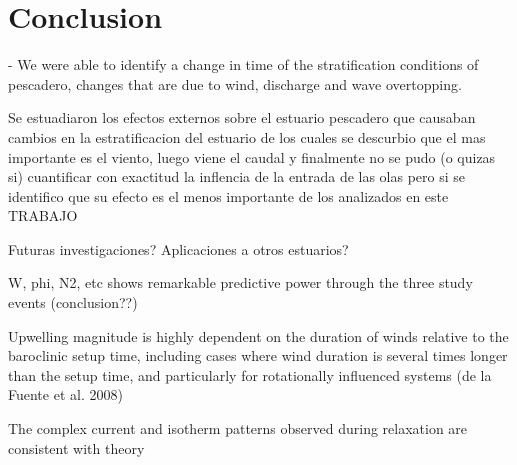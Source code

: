 \documentclass[tesis.tex]{subfiles}
\begin{document}
  
\section{Conclusion}
- We were able to identify a change in time of the stratification conditions of pescadero, changes that are due to wind, discharge and wave overtopping.

Se estuadiaron los efectos externos sobre el estuario pescadero que causaban cambios en la estratificacion del estuario de los cuales se descurbio que el mas importante es el viento, luego viene el caudal y finalmente no se pudo (o quizas si) cuantificar con exactitud la inflencia de la entrada de las olas pero si se identifico que su efecto es el menos importante de los analizados en este TRABAJO



Futuras investigaciones?
Aplicaciones a otros estuarios?

W, phi, N2, etc shows remarkable predictive power through the three study
events (conclusion??)

Upwelling magnitude is highly dependent on the duration of
winds relative to the baroclinic setup time, including cases
where wind duration is several times longer than the setup
time, and particularly for rotationally influenced systems
(de la Fuente et al. 2008)

The complex current and isotherm patterns observed during relaxation are consistent with theory
\end{document}
